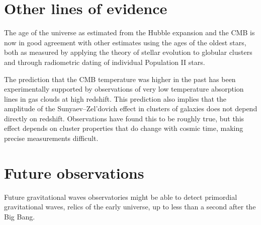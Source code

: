 \documentclass[14pt, oneside]{book}
\begin{document}
	\section{Other lines of evidence}
		The age of the universe as estimated from the Hubble expansion and the CMB is now in good agreement with other estimates using the ages of the oldest stars, both as measured by applying the theory of stellar evolution to globular clusters and through radiometric dating of individual Population II stars.
		
		The prediction that the CMB temperature was higher in the past has been experimentally supported by observations of very low temperature absorption lines in gas clouds at high redshift. This prediction also implies that the amplitude of the Sunyaev–Zel'dovich effect in clusters of galaxies does not depend directly on redshift. Observations have found this to be roughly true, but this effect depends on cluster properties that do change with cosmic time, making precise measurements difficult.
		
	\section{Future observations}
		Future gravitational waves observatories might be able to detect primordial gravitational waves, relics of the early universe, up to less than a second after the Big Bang. 
\end{document}
